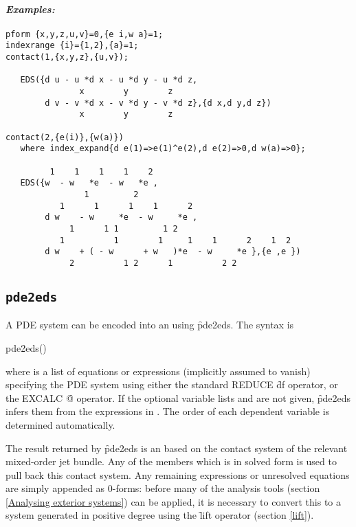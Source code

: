 \paragraph{\it Examples:}
\begin{verbatim}
pform {x,y,z,u,v}=0,{e i,w a}=1;
indexrange {i}={1,2},{a}=1;
contact(1,{x,y,z},{u,v});

   EDS({d u - u *d x - u *d y - u *d z,
               x        y        z 
        d v - v *d x - v *d y - v *d z},{d x,d y,d z})
               x        y        z 

contact(2,{e(i)},{w(a)}) 
   where index_expand{d e(1)=>e(1)^e(2),d e(2)=>0,d w(a)=>0};

         1    1    1    1    2
   EDS({w  - w   *e  - w   *e ,
                1         2 
           1      1      1    1      2
        d w    - w     *e  - w     *e ,
             1      1 1         1 2 
           1          1        1     1    1      2    1  2
        d w    + ( - w      + w   )*e  - w     *e },{e ,e })
             2          1 2      1          2 2 
\end{verbatim}

\subsection{\tt pde2eds}
\label{pde2eds}

A PDE system can be encoded into an  using \f{pde2eds}. The
syntax is
\begin{syntax}
	pde2eds()
\end{syntax}
where  is a list of equations or expressions (implicitly assumed
to vanish) specifying the PDE system using either
the standard REDUCE \f{df} operator, or the EXCALC \f{@} operator. If the
optional variable lists  and  are not
given, \f{pde2eds} infers them from the expressions in . The
order of each dependent variable is determined automatically.

The result returned by \f{pde2eds} is an  based on the contact
system of the relevant mixed-order jet bundle. Any of the 
members which is in solved form is used to pull back this contact
system. Any remaining expressions or unresolved equations are simply
appended as 0-forms: before many of the analysis tools (section
\ref{Analysing exterior systems}) can be applied, it is necessary to
convert this to a system generated in positive degree using the \f{lift}
operator (section \ref{lift}).

